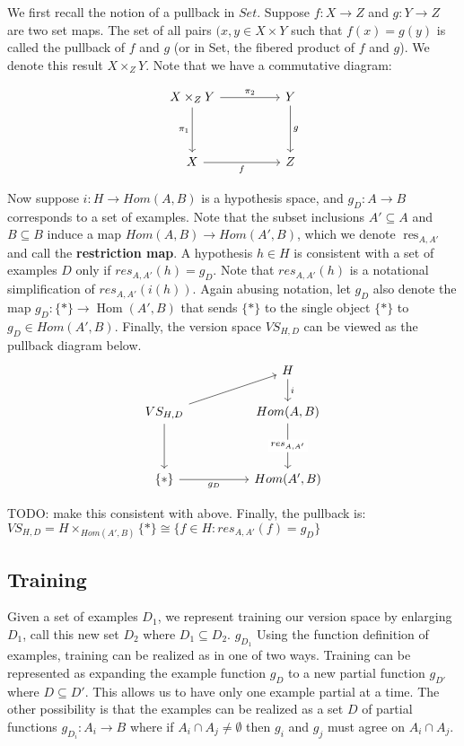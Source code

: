 \documentclass{article}
\theoremstyle{definition}
\begin{document}
We first recall the notion of a pullback in $Set$. Suppose $f:X\rightarrow Z$ and $g:Y\rightarrow Z$ are two set maps. The set of all pairs $(x,y \in X \times Y$ such that $f(x) = g(y)$ is called the pullback of $f$ and $g$ (or in Set, the fibered product of $f$ and $g$). We denote this result $X \times_Z Y$. Note that we have a commutative diagram: 

\[\begin{tikzcd}
	{X\times_Z Y} && Y \\
	\\
	X && Z
	\arrow["{\pi_2}", from=1-1, to=1-3]
	\arrow["{\pi_1}"', from=1-1, to=3-1]
	\arrow["f"', from=3-1, to=3-3]
	\arrow["g", from=1-3, to=3-3]
\end{tikzcd}\]

Now suppose $i:H \rightarrow Hom(A,B)$ is a hypothesis space, and $g_D: A\rightarrow B$ corresponds to a set of examples. Note that the subset inclusions $A' \subseteq A$ and $B \subseteq B$ induce a map $Hom(A,B) \rightarrow Hom(A',B)$, which we denote $\operatorname{res}_{A,A'}$ and call the \textbf{restriction map}. A hypothesis $h \in H$ is consistent with a set of examples $D$ only if $res_{A,A'}(h) = g_D$. Note that $res_{A,A'}(h)$ is a notational simplification of $res_{A,A'}(i(h))$. Again abusing notation, let $g_D$ also denote the map $g_D: \{*\}\rightarrow \operatorname{Hom}(A',B)$ that sends $\{*\}$ to the single object $\{*\}$ to $g_D \in Hom(A', B)$. Finally, the version space $VS_{H,D}$ can be viewed as the pullback diagram below. 
\[\begin{tikzcd}
	&& H \\
	{VS_{H,D}} && {Hom(A,B)} \\
	\\
	\{*\} && {Hom(A', B)}
	\arrow[from=2-1, to=4-1]
	\arrow["{g_D}"', from=4-1, to=4-3]
	\arrow[from=2-1, to=1-3]
	\arrow["{res_{A,A'}}"{description}, from=2-3, to=4-3]
	\arrow["i", from=1-3, to=2-3]
\end{tikzcd}\]

TODO: make this consistent with above. Finally, the pullback is: $VS_{H,D} = H\times_{Hom(A',B)} \{*\} \cong  \{f\in H : res_{A, A'}(f) = g_D\}$ 

\subsection{Training}
Given a set of examples $D_1$, we represent training our version space by enlarging $D_1$, call this new set $D_2$ where $D_1 \subseteq D_2$. $g_{D_1}$
Using the function definition of examples, training can be realized as in one of two ways. Training can be represented as expanding the example function $g_D$ to a new partial function $g_{D'}$ where $D\subseteq D'$. This allows us to have only one example partial at a time. The other possibility is that the examples can be realized as a set $D$ of partial functions $g_{D_i}: A_i \rightarrow B $ where if $A_i \cap A_j \ne \emptyset$ then $g_i$ and $g_j$ must agree on $A_i \cap A_j$.
\end{document}
